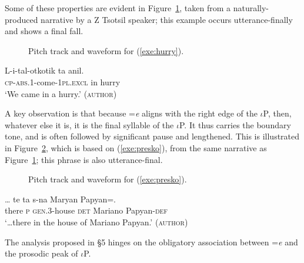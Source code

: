 \documentclass[output=paper,
modfonts
]{LSP/langsci}
\begin{document}
Some of these properties are evident in Figure~\ref{fig:hurry}, taken from a naturally-produced narrative by a Z Tsotsil speaker; this example occurs utterance-finally
and shows a final fall.

\begin{figure}
	\caption{Pitch track and waveform for (\ref{exe:hurry}).}
	\label{fig:hurry}
\end{figure}

\begin{exe}
\ex
\gll L-i-tal-otkotik ta anil. \\
\textsc{cp-abs.1}-come-\textsc{1pl.excl} in hurry \\
\glt `We came in a hurry.'  (\textsc{author})
\label{exe:hurry}
\end{exe}

A key observation is that because =\emph{e} aligns with the right edge of the $\iota$P, then, whatever else it is, it is the 
final syllable of the $\iota$P. It thus carries the boundary tone, and is often followed by significant pause and lengthened.
This is illustrated in Figure~\ref{fig:presko}, which is based on (\ref{exe:presko}), from the same narrative as Figure~\ref{fig:hurry}; this phrase is also utterance-final.

\begin{figure}
	\caption{Pitch track and waveform for (\ref{exe:presko}).}
	\label{fig:presko}
\end{figure}

\begin{exe}
\ex\label{exe:presko}\bridgeoverex
\gll \dots {}  te ta s-na  Maryan Papyan=. \\
{} there \textsc{p} \textsc{gen.3}-house \textsc{det} Mariano Papyan-\textsc{def} \\
\glt `\dots there in the house of Mariano Papyan.'  (\textsc{author})
 \end{exe}

The analysis proposed in \S5 hinges on the obligatory association between =\emph{e}  and the prosodic peak of $\iota$P. 
\end{document}

